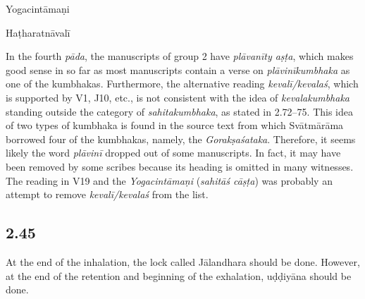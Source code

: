 \begin{ekdosis}
\begin{testimonia}[hp02_044]
Yogacintāmaṇi

\begin{versinnote}
\end{versinnote}

Haṭharatnāvalī

\begin{versinnote}
\end{versinnote}
\end{testimonia}

\begin{philcomm}[hp02_044]
In the fourth \emph{pāda}, the manuscripts of group 2 have \emph{plāvanīty aṣṭa}, which makes good sense in so far as most manuscripts contain a verse on \emph{plāvinīkumbhaka} as one of the kumbhakas. Furthermore, the alternative reading \emph{kevalī/kevalaś}, which is supported by V1, J10, etc., is not consistent with the idea of \emph{kevalakumbhaka} standing outside the category of \emph{sahitakumbhaka}, as stated in 2.72–75. This idea of two types of kumbhaka is found in the source text from which Svātmārāma borrowed four of the kumbhakas, namely, the \emph{Gorakṣaśataka}. Therefore, it seems likely the word \emph{plāvinī} dropped out of some manuscripts. In fact, it may have been removed by some scribes because its heading is omitted in many witnesses. The reading in V19 and the \emph{Yogacintāmaṇi} (\emph{sahitāś cāṣṭa}) was probably an attempt to remove \emph{kevalī/kevalaś} from the list.
\end{philcomm}

\subsection*{2.45}
\begin{translation}[hp02_045]
At the end of the inhalation, the lock called Jālandhara should be done. However, at the end of the retention and beginning of the exhalation, uḍḍiyāna should be done.
\end{translation}


\end{ekdosis}
